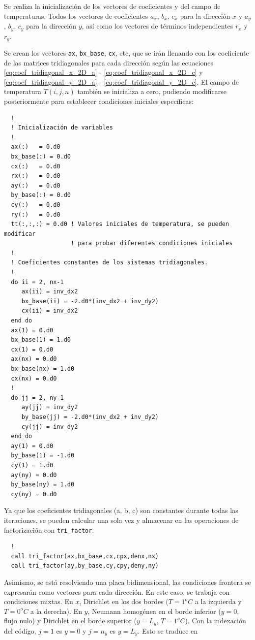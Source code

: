 \documentclass[11pt,a4paper]{article}
\begin{document}
Se realiza la inicializaci\'on de los vectores de coeficientes y del campo de 
temperaturas. Todos los vectores de coeficientes $a_x$, $b_x$, $c_x$ para la 
direcci\'on $x$ y $a_y$, $b_y$, $c_y$ para la direcci\'on $y$, así como los 
vectores de t\'erminos independientes $r_x$ y $r_y$. 

\medskip

Se crean los vectores \texttt{ax}, \texttt{bx\_base}, \texttt{cx}, etc, que 
se ir\'an llenando con los coeficiente de las matrices tridiagonales para cada 
direcci\'on seg\'un las ecuaciones \ref{eq:coef_tridiagonal_x_2D_a} - 
\ref{eq:coef_tridiagonal_x_2D_c} y \ref{eq:coef_tridiagonal_y_2D_a} - 
\ref{eq:coef_tridiagonal_y_2D_c}. El campo de temperatura $T(i,j,n)$ también se inicializa a cero, pudiendo 
modificarse posteriormente para establecer condiciones iniciales espec\'ificas:

\begin{verbatim}
  !
  ! Inicialización de variables
  !
  ax(:)   = 0.d0
  bx_base(:) = 0.d0
  cx(:)   = 0.d0
  rx(:)   = 0.d0
  ay(:)   = 0.d0
  by_base(:) = 0.d0
  cy(:)   = 0.d0
  ry(:)   = 0.d0
  tt(:,:,:) = 0.d0 ! Valores iniciales de temperatura, se pueden modificar 
                   ! para probar diferentes condiciones iniciales
  !
  ! Coeficientes constantes de los sistemas tridiagonales.
  !
  do ii = 2, nx-1
     ax(ii) = inv_dx2
     bx_base(ii) = -2.d0*(inv_dx2 + inv_dy2)
     cx(ii) = inv_dx2
  end do
  ax(1) = 0.d0
  bx_base(1) = 1.d0
  cx(1) = 0.d0
  ax(nx) = 0.d0
  bx_base(nx) = 1.d0
  cx(nx) = 0.d0
  !
  do jj = 2, ny-1
     ay(jj) = inv_dy2
     by_base(jj) = -2.d0*(inv_dx2 + inv_dy2)
     cy(jj) = inv_dy2
  end do
  ay(1) = 0.d0
  by_base(1) = -1.d0
  cy(1) = 1.d0
  ay(ny) = 0.d0
  by_base(ny) = 1.d0
  cy(ny) = 0.d0
\end{verbatim}

Ya que los coeficientes tridiagonales (a, b, c) son constantes durante todas las
iteraciones, se pueden calcular una sola vez y almacenar en las operaciones de 
factorizaci\'on con \texttt{tri\_factor}.

\begin{verbatim}
  !
  call tri_factor(ax,bx_base,cx,cpx,denx,nx)
  call tri_factor(ay,by_base,cy,cpy,deny,ny)
\end{verbatim}

Asimismo, se est\'a resolviendo una placa bidimensional, las condiciones 
frontera se expresar\'an como vectores para cada direcci\'on. 
En este caso, se trabaja con condiciones mixtas. En $x$, Dirichlet en los dos
bordes ($T=1^{o}C$ a la izquierda y $T=0^{o}C$ a la derecha). En $y$, Neumann
homog\'enea en el borde inferior ($y=0$, flujo nulo) y Dirichlet en el borde
superior ($y=L_y$, $T=1^{o}C$). Con la indexaci\'on del c\'odigo, $j=1$ es
$y=0$ y $j=n_y$ es $y=L_y$. Esto se traduce en
\end{document}
